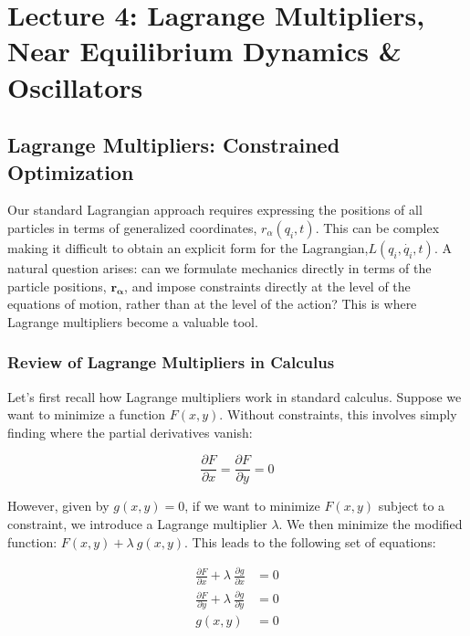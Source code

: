 \section{Lecture 4: Lagrange Multipliers, Near Equilibrium Dynamics \& Oscillators}

\subsection{Lagrange Multipliers: Constrained Optimization}

Our standard Lagrangian approach requires expressing the positions of all particles in terms of generalized coordinates, $r_\alpha\left(q_i, t\right)$. This can be complex making it difficult to obtain an explicit form for the Lagrangian,$L\left(q_i, \dot{q_i}, t\right)$. A natural question arises: can we formulate mechanics directly in terms of the particle positions, $\mathbf{r_\alpha}$, and impose constraints directly at the level of the equations of motion, rather than at the level of the action? This is where Lagrange multipliers become a valuable tool.

\subsubsection{Review of Lagrange Multipliers in Calculus}

Let's first recall how Lagrange multipliers work in standard calculus. Suppose we want to minimize a function $F\left(x, y\right)$. Without constraints, this involves simply finding where the partial derivatives vanish:

\begin{equation}
    \frac{\partial F}{\partial x} = \frac{\partial F}{\partial y} = 0
\end{equation}

However, given by $g\left(x, y\right) = 0$, if we want to minimize $F\left(x, y\right)$ subject to a constraint, we introduce a Lagrange multiplier $\lambda$. We then minimize the modified function: $F\left(x, y\right) + \lambda \ g\left(x, y\right)$. This leads to the following set of equations:

\begin{align}
    \frac{\partial F}{\partial x} + \lambda \ \frac{\partial g}{\partial x} &= 0 \\
    \frac{\partial F}{\partial y} + \lambda \ \frac{\partial g}{\partial y} &= 0 \\
    g\left(x, y\right) &= 0 
\end{align}

